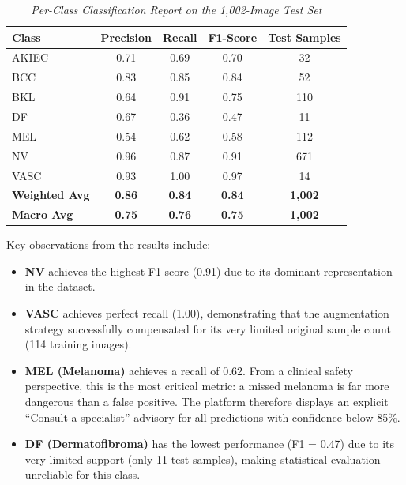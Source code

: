\begin{table}[H]
	\centering
	\renewcommand{\arraystretch}{1.5}
	\begin{tabular}{|l|c|c|c|c|}
		\hline
		\rowcolor[HTML]{1F3864}
		{\color{white}\textbf{Class}} &
		{\color{white}\textbf{Precision}} &
		{\color{white}\textbf{Recall}} &
		{\color{white}\textbf{F1-Score}} &
		{\color{white}\textbf{Test Samples}} \\
		\hline
		AKIEC & 0.71 & 0.69 & 0.70 &  32 \\
		\hline
		BCC   & 0.83 & 0.85 & 0.84 &  52 \\
		\hline
		BKL   & 0.64 & 0.91 & 0.75 & 110 \\
		\hline
		DF    & 0.67 & 0.36 & 0.47 &  11 \\
		\hline
		MEL   & 0.54 & 0.62 & 0.58 & 112 \\
		\hline
		NV    & 0.96 & 0.87 & 0.91 & 671 \\
		\hline
		VASC  & 0.93 & 1.00 & 0.97 &  14 \\
		\hline
		\rowcolor[HTML]{EEF6FF}
		\textbf{Weighted Avg} & \textbf{0.86} & \textbf{0.84} & \textbf{0.84} & \textbf{1,002} \\
		\hline
		\rowcolor[HTML]{EEF6FF}
		\textbf{Macro Avg}    & \textbf{0.75} & \textbf{0.76} & \textbf{0.75} & \textbf{1,002} \\
		\hline
	\end{tabular}
	\caption{\textit{Per-Class Classification Report on the 1,002-Image Test Set}}
	\label{tab:classification_report}
\end{table}

Key observations from the results include:
\begin{itemize}
	\item \textbf{NV} achieves the highest F1-score (0.91) due to its dominant
	representation in the dataset.
	\item \textbf{VASC} achieves perfect recall (1.00), demonstrating that the
	augmentation strategy successfully compensated for its very limited
	original sample count (114 training images).
	\item \textbf{MEL (Melanoma)} achieves a recall of 0.62. From a clinical
	safety perspective, this is the most critical metric: a missed melanoma
	is far more dangerous than a false positive. The platform therefore
	displays an explicit ``Consult a specialist'' advisory for all
	predictions with confidence below 85\%.
	\item \textbf{DF (Dermatofibroma)} has the lowest performance (F1 = 0.47)
	due to its very limited support (only 11 test samples), making
	statistical evaluation unreliable for this class.
\end{itemize}

